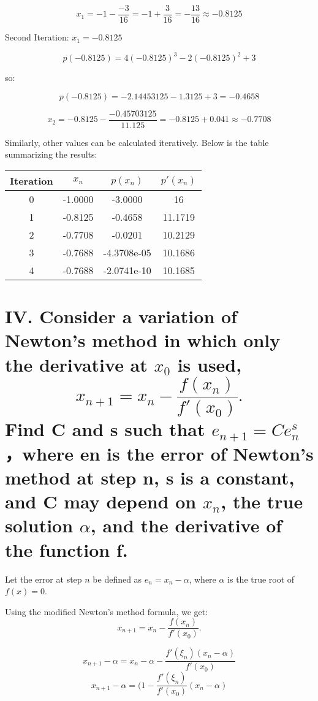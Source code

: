 \documentclass[a4paper]{article}
\begin{document}
\[x_1 = -1 - \frac{-3}{16} = -1 + \frac{3}{16} = -\frac{13}{16} \approx -0.8125\]

Second Iteration:
\( x_1 = -0.8125 \)

\[p(-0.8125) = 4(-0.8125)^3 - 2(-0.8125)^2 + 3\]

so:

\[p(-0.8125) = -2.14453125 - 1.3125 + 3 = -0.4658\]

\[x_2 = -0.8125 - \frac{-0.45703125}{11.125} = -0.8125 + 0.041 \approx -0.7708\]

Similarly, other values can be calculated iteratively.
Below is the table summarizing the results:

\begin{table}[h!]
  \centering
  \begin{tabular}{|c|c|c|c|}
    \hline
    \textbf{Iteration}& \( x_n \) & \( p(x_n) \) & \(p'(x_n)\)\\
    \hline
    0 & -1.0000 & -3.0000 & 16\\
    \hline
    1 & -0.8125 & -0.4658 & 11.1719\\
    \hline
    2 & -0.7708 & -0.0201 &10.2129\\
    \hline
    3 & -0.7688 & -4.3708e-05 &10.1686\\
    \hline
    4 & -0.7688 & -2.0741e-10 &10.1685\\
    \hline
  \end{tabular}
\end{table}

\section*{IV. Consider a variation of Newton’s method in which only the derivative at $x_0$ is used,\[x_{n+1} = x_n - \frac{f(x_n)}{f'(x_0)}.\] Find C and s such that $e_{n+1} = C e_n^s$，where en is the error of Newton’s method at step n, s is a constant, and C may depend on  \(x_n\), the true solution $\alpha$, and the derivative of the function f.}

   Let the error at step \( n \) be defined as \( e_n = x_n - \alpha \), where \( \alpha \) is the true root of \( f(x) = 0 \). 
   
   Using the modified Newton’s method formula, we get:
   \[x_{n+1} = x_n - \frac{f(x_n)}{f'(x_0)}.\]

    \[x_{n+1} - \alpha = x_n - \alpha - \frac{f'(\xi_n) (x_n - \alpha)} {f'(x_0)}\]
    \[x_{n+1} - \alpha = (1 - \frac{f'(\xi_n)}{f'(x_0)}(x_n - \alpha)\]
\end{document}

